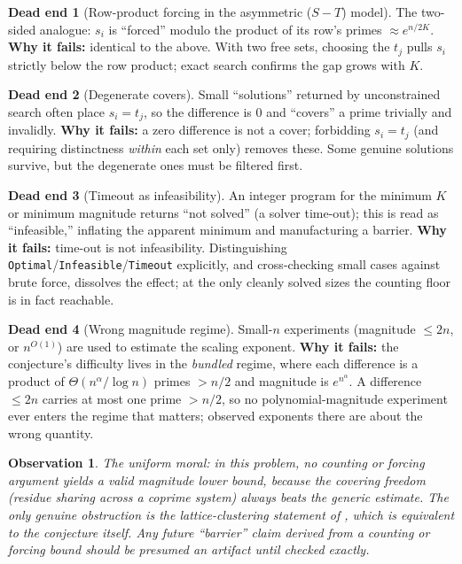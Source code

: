 \documentclass[11pt]{article}
\newtheorem{observation}{Observation}
\theoremstyle{definition}
\newtheorem{deadend}{Dead end}
\begin{document}
\begin{deadend}[Row-product forcing in the asymmetric ($S-T$) model]
The two-sided analogue: $s_i$ is ``forced'' modulo the product of its row's primes
$\approx e^{n/2K}$. \textbf{Why it fails:} identical to the above. With two free
sets, choosing the $t_j$ pulls $s_i$ strictly below the row product; exact search
confirms the gap grows with $K$.
\end{deadend}

\begin{deadend}[Degenerate covers]
Small ``solutions'' returned by unconstrained search often place $s_i=t_j$, so the
difference is $0$ and ``covers'' a prime trivially and invalidly. \textbf{Why it
fails:} a zero difference is not a cover; forbidding $s_i=t_j$ (and requiring
distinctness \emph{within} each set only) removes these. Some genuine solutions
survive, but the degenerate ones must be filtered first.
\end{deadend}

\begin{deadend}[Timeout as infeasibility]
An integer program for the minimum $K$ or minimum magnitude returns
``not solved'' (a solver time-out); this is read as ``infeasible,'' inflating the
apparent minimum and manufacturing a barrier. \textbf{Why it fails:} time-out is
not infeasibility. Distinguishing \texttt{Optimal}/\texttt{Infeasible}/\texttt{Timeout}
explicitly, and cross-checking small cases against brute force, dissolves the effect;
at the only cleanly solved sizes the counting floor is in fact reachable.
\end{deadend}

\begin{deadend}[Wrong magnitude regime]
Small-$n$ experiments (magnitude $\le 2n$, or $n^{O(1)}$) are used to estimate the
scaling exponent. \textbf{Why it fails:} the conjecture's difficulty lives in the
\emph{bundled} regime, where each difference is a product of $\Theta(n^{\alpha}/\log
n)$ primes $>n/2$ and magnitude is $e^{n^{\alpha}}$. A difference $\le 2n$ carries
at most one prime $>n/2$, so no polynomial-magnitude experiment ever enters the
regime that matters; observed exponents there are about the wrong quantity.
\end{deadend}

\begin{observation}
The uniform moral: in this problem, no counting or forcing argument yields a valid
magnitude lower bound, because the covering freedom (residue sharing across a
coprime system) always beats the generic estimate. The only genuine obstruction is
the lattice-clustering statement of \cite{main}, which is equivalent to the
conjecture itself. \emph{Any future ``barrier'' claim derived from a counting or
forcing bound should be presumed an artifact until checked exactly.}
\end{observation}
\end{document}
